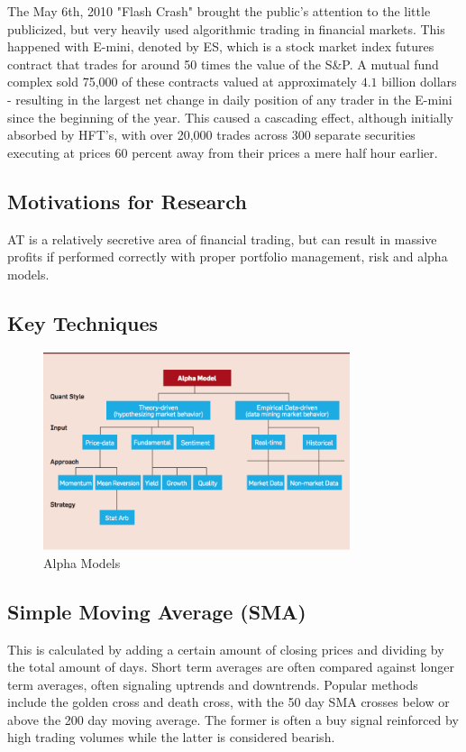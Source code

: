 \documentclass[letterpaper,11pt]{article}
\begin{document}
The May 6th, 2010 "Flash Crash" brought the public's attention to the little publicized, but very heavily used algorithmic trading in financial markets. This happened with E-mini, denoted by ES, which is a stock market index futures contract that trades for around 50 times the value of the S\&P. A mutual fund complex sold 75,000 of these contracts valued at approximately $4.1$ billion dollars - resulting in the largest net change in daily position of any trader in the E-mini since the beginning of the year. This caused a cascading effect, although initially absorbed by HFT's, with over 20,000 trades across 300 separate securities executing at prices 60 percent away from their prices a mere half hour earlier.  

\subsection*{Motivations for Research}

AT is a relatively secretive area of financial trading, but can result in massive profits if performed correctly with proper portfolio management, risk and alpha models. 

\subsection*{Key Techniques}

\begin{figure}[ht!]
\centering
\includegraphics[width=90mm]{alpha.png}
\caption{Alpha Models \label{overflow}}
\end{figure}

\subsection*{Simple Moving Average (SMA)}

This is calculated by adding a certain amount of closing prices and dividing by the total amount of days. Short term averages are often compared against longer term averages, often signaling uptrends and downtrends. Popular methods include the golden cross and death cross, with the 50 day SMA crosses below or above the 200 day moving average. The former is often a buy signal reinforced by high trading volumes while the latter is considered bearish.
\end{document}
